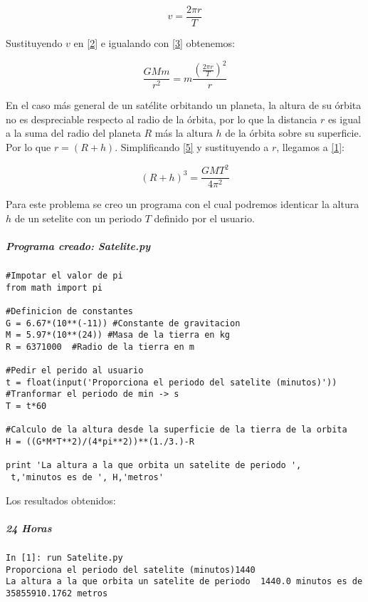 \documentclass[12pt]{article}
\begin{document}
\begin{equation} \label{4}
v=\frac{2\pi r}{T}
\end{equation}

Sustituyendo $v$ en \eqref{2} e igualando con \eqref{3} obtenemos:

\begin{equation} \label{5}
\frac{GMm}{r^2}=m\frac{{(\frac{2\pi r}{T})}^2}{r}
\end{equation}

En el caso más general de un satélite orbitando un planeta, la altura de su órbita no es despreciable respecto al radio de la órbita, por lo que la distancia $r$ es igual a la suma del radio del planeta $R$ más la altura $h$ de la órbita sobre su superficie. Por lo que $r=(R+h)$. Simplificando \eqref{5} y sustituyendo a $r$, llegamos a \eqref{1}:

\begin{equation}
(R+h)^3=\frac{GMT^2}{4\pi^2}
\end{equation}

Para este problema se creo un programa con el cual podremos identicar la altura $h$ de un setelite con un periodo $T$ definido por el usuario.

\subparagraph*{Programa creado: Satelite.py}

\begin{verbatim}
#Impotar el valor de pi
from math import pi

#Definicion de constantes
G = 6.67*(10**(-11)) #Constante de gravitacion
M = 5.97*(10**(24)) #Masa de la tierra en kg
R = 6371000  #Radio de la tierra en m

#Pedir el perido al usuario
t = float(input('Proporciona el periodo del satelite (minutos)'))
#Tranformar el periodo de min -> s
T = t*60

#Calculo de la altura desde la superficie de la tierra de la orbita
H = ((G*M*T**2)/(4*pi**2))**(1./3.)-R

print 'La altura a la que orbita un satelite de periodo ',
 t,'minutos es de ', H,'metros'
\end{verbatim}

Los resultados obtenidos:

\subparagraph*{24 Horas}
\begin{verbatim}
In [1]: run Satelite.py
Proporciona el periodo del satelite (minutos)1440
La altura a la que orbita un satelite de periodo  1440.0 minutos es de  35855910.1762 metros
\end{verbatim}
\end{document}
